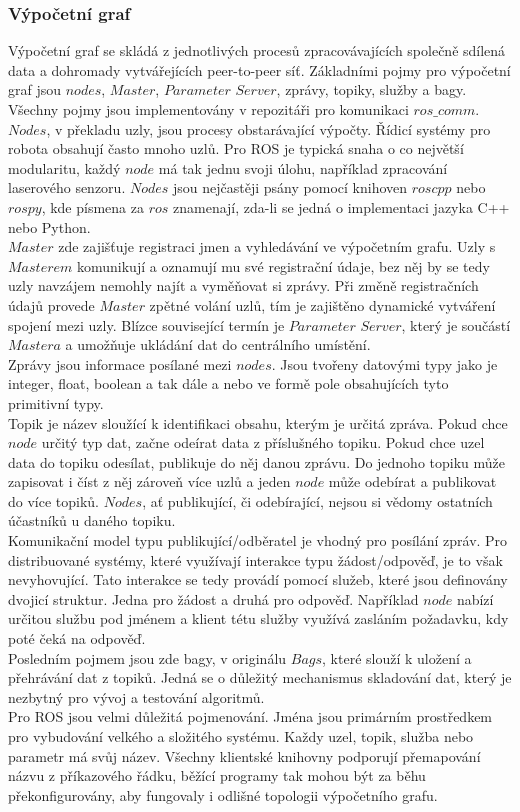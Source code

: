 \documentclass[12pt]{article}
\begin{document}
\subsubsection{Výpočetní graf}
Výpočetní graf se skládá z jednotlivých procesů zpracovávajících společně sdílená data a dohromady vytvářejících peer-to-peer síť. Základními pojmy pro výpočetní graf jsou $nodes$, $Master$, $Parameter$ $Server$, zprávy, topiky, služby a bagy. Všechny pojmy jsou implementovány v repozitáři pro komunikaci $ros\_comm$.\\
\indent $Nodes$, v překladu uzly, jsou procesy obstarávající výpočty. Řídicí systémy pro robota obsahují často mnoho uzlů. Pro ROS je typická snaha o co největší modularitu, každý $node$ má tak jednu svoji úlohu, například zpracování laserového senzoru. $Nodes$ jsou nejčastěji psány pomocí knihoven $roscpp$ nebo $rospy$, kde písmena za $ros$ znamenají, zda-li se jedná o implementaci jazyka C++ nebo Python.\\
\indent $Master$ zde zajišťuje registraci jmen a vyhledávání ve výpočetním grafu. Uzly s $Masterem$ komunikují a oznamují mu své registrační údaje, bez něj by se tedy uzly navzájem nemohly najít a vyměňovat si zprávy. Při změně registračních údajů provede $Master$ zpětné volání uzlů, tím je zajištěno dynamické vytváření spojení mezi uzly. Blízce související termín je $Parameter$ $Server$, který je součástí $Mastera$ a umožňuje ukládání dat do centrálního umístění.\\
\indent Zprávy jsou informace posílané mezi $nodes$. Jsou tvořeny datovými typy jako je integer, float, boolean a tak dále a nebo ve formě pole obsahujících tyto primitivní typy.\\
\indent Topik je název sloužící k identifikaci obsahu, kterým je určitá zpráva. Pokud chce $node$ určitý typ dat, začne odeírat data z příslušného topiku. Pokud chce uzel data do topiku odesílat, publikuje do něj danou zprávu. Do jednoho topiku může zapisovat i číst z něj zároveň více uzlů a jeden $node$ může odebírat a publikovat do více topiků. $Nodes$, ať publikující, či odebírající, nejsou si vědomy ostatních účastníků u daného topiku.\\
\indent Komunikační model typu publikující/odběratel je vhodný pro posílání zpráv. Pro distribuované systémy, které využívají interakce typu žádost/odpověď, je to však nevyhovující. Tato interakce se tedy provádí pomocí služeb, které jsou definovány dvojicí struktur. Jedna pro žádost a druhá pro odpověď. Například $node$ nabízí určitou službu pod jménem a klient tétu služby využívá zasláním požadavku, kdy poté čeká na odpověď.\\
\indent Posledním pojmem jsou zde bagy, v originálu $Bags$, které slouží k uložení a přehrávání dat z topiků. Jedná se o důležitý mechanismus skladování dat, který je nezbytný pro vývoj a testování algoritmů.\\
\indent Pro ROS jsou velmi důležitá pojmenování. Jména jsou primárním prostředkem pro vybudování velkého a složitého systému. Každy uzel, topik, služba nebo parametr má svůj název. Všechny klientské knihovny podporují přemapování názvu z příkazového řádku, běžící programy tak mohou být za běhu překonfigurovány, aby fungovaly i odlišné topologii výpočetního grafu.\\
\end{document}
